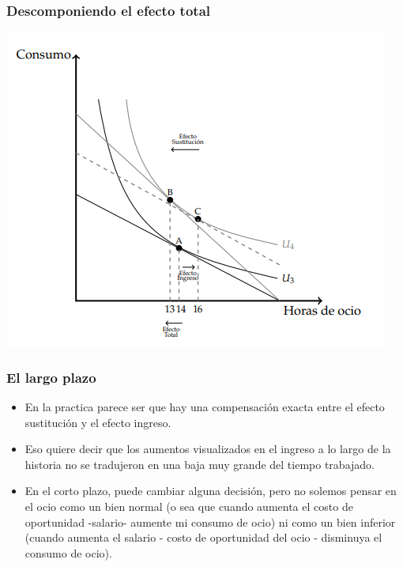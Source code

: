 \documentclass{beamer}
\begin{document}
\begin{frame}
  \frametitle{Descomponiendo el efecto total}
  \begin{center}
    \includegraphics[scale=0.8]{../Figures/C9.11.png}
  \end{center}
\end{frame}

\begin{frame}
  \frametitle{El largo plazo}
  \begin{itemize}

    \item En la practica parece ser que hay una compensación exacta entre el efecto sustitución y el efecto ingreso.
    \item Eso quiere decir que los aumentos visualizados en el ingreso a lo largo de la historia no se tradujeron en una baja muy grande del tiempo trabajado.
    \item En el corto plazo, puede cambiar alguna decisión, pero no solemos pensar en el ocio como un bien normal (o sea que cuando aumenta el costo de oportunidad -salario- aumente mi consumo de ocio) ni como un bien inferior (cuando aumenta el salario - costo de oportunidad del ocio - disminuya el consumo de ocio).

  \end{itemize}

\end{frame}
\end{document}
